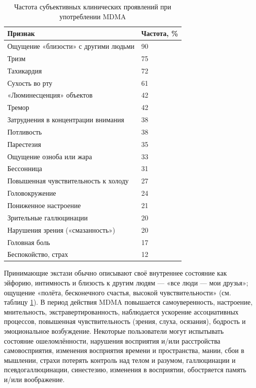 \documentclass[a4paper,14pt,russian]{report}
\begin{document}
\begin{table}[!htb]
\centering
\caption{Частота субъективных клинических проявлений при употреблении MDMA}
\label{table:effects}
\begin{tabular}{|l|l|}
  \hline
  Признак                              & Частота, \% \\
  \hline
  Ощущение «близости» с другими людьми & 90 \\
  Тризм                                & 75 \\
  Тахикардия                           & 72 \\
  Сухость во рту                       & 61 \\
  «Люминесценция» объектов             & 42 \\
  Тремор                               & 42 \\
  Затруднения в концентрации внимания  & 38 \\
  Потливость                           & 38 \\
  Парестезия                           & 35 \\
  Ощущение озноба или жара             & 33 \\
  Бессонница                           & 31 \\
  Повышенная чувствительность к холоду & 27 \\
  Головокружение                       & 24 \\
  Пониженное настроение                & 21 \\
  Зрительные галлюцинации              & 20 \\
  Нарушения зрения («смазанность»)     & 20 \\
  Головная боль                        & 17 \\
  Беспокойство, страх                  & 12 \\
  \hline
\end{tabular}
\end{table}

Принимающие экстази обычно описывают своё внутреннее состояние как эйфорию, интимность и близость к другим людям — «все люди — мои друзья»; ощущение «полёта, бесконечного счастья, высокой чувствительности» (см. таблицу \ref{table:effects}). В период действия MDMA повышается самоуверенность, настроение, мнительность, экстравертированность, наблюдается ускорение ассоциативных процессов, повышенная чувствительность (зрения, слуха, осязания), бодрость и эмоциональное возбуждение. Некоторые пользователи могут испытывать состояние ошеломлённости, нарушения восприятия и/или расстройства самовосприятия, изменения восприятия времени и пространства, мании, сбои в мышлении, страхи потерять контроль над телом и разумом, галлюцинации и псевдогаллюцинации, синестезию, изменения в восприятии, обостряется память и/или воображение.
\end{document}
